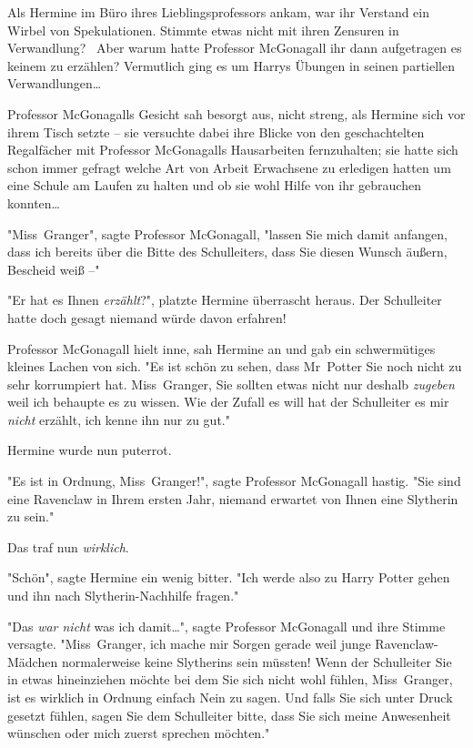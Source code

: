 {Als Hermine im Büro ihres Lieblingsprofessors ankam, war ihr Verstand ein Wirbel von Spekulationen. Stimmte etwas nicht mit ihren Zensuren in Verwandlung? ~Aber warum hatte Professor McGonagall ihr dann aufgetragen es keinem zu erzählen? Vermutlich ging es um Harrys Übungen in seinen partiellen Verwandlungen…

Professor McGonagalls Gesicht sah besorgt aus, nicht streng, als Hermine sich vor ihrem Tisch setzte -- sie versuchte dabei ihre Blicke von den geschachtelten Regalfächer mit Professor McGonagalls Hausarbeiten fernzuhalten; sie hatte sich schon immer gefragt welche Art von Arbeit Erwachsene zu erledigen hatten um eine Schule am Laufen zu halten und ob sie wohl Hilfe von ihr gebrauchen konnten…

"Miss~Granger", sagte Professor McGonagall, "lassen Sie mich damit anfangen, dass ich bereits über die Bitte des Schulleiters, dass Sie diesen Wunsch äußern, Bescheid weiß --"

"Er hat es Ihnen \emph{erzählt}?", platzte Hermine überrascht heraus. Der Schulleiter hatte doch gesagt niemand würde davon erfahren!

Professor McGonagall hielt inne, sah Hermine an und gab ein schwermütiges kleines Lachen von sich. "Es ist schön zu sehen, dass Mr~Potter Sie noch nicht zu sehr korrumpiert hat. Miss~Granger, Sie sollten etwas nicht nur deshalb \emph{zugeben} weil ich behaupte es zu wissen. Wie der Zufall es will hat der Schulleiter es mir \emph{nicht} erzählt, ich kenne ihn nur zu gut."

Hermine wurde nun puterrot.

"Es ist in Ordnung, Miss~Granger!", sagte Professor McGonagall hastig. "Sie sind eine Ravenclaw in Ihrem ersten Jahr, niemand erwartet von Ihnen eine Slytherin zu sein."

Das traf nun \emph{wirklich}.

"Schön", sagte Hermine ein wenig bitter. "Ich werde also zu Harry Potter gehen und ihn nach Slytherin-Nachhilfe fragen."

"Das \emph{war nicht} was ich damit…", sagte Professor McGonagall und ihre Stimme versagte. "Miss~Granger, ich mache mir Sorgen gerade weil junge Ravenclaw-Mädchen normalerweise keine Slytherins sein müssten! Wenn der Schulleiter Sie in etwas hineinziehen möchte bei dem Sie sich nicht wohl fühlen, Miss~Granger, ist es wirklich in Ordnung einfach Nein zu sagen. Und falls Sie sich unter Druck gesetzt fühlen, sagen Sie dem Schulleiter bitte, dass Sie sich meine Anwesenheit wünschen oder mich zuerst sprechen möchten."

}
